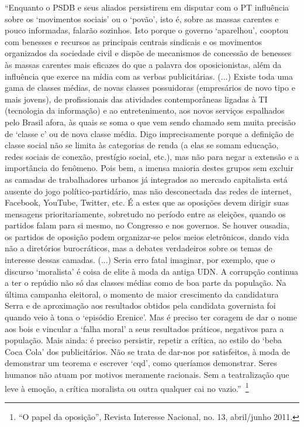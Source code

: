 ``Enquanto o PSDB e seus aliados persistirem em disputar com o PT
influência sobre os `movimentos sociais' ou o `povão', isto é, sobre as
massas carentes e pouco informadas, falarão sozinhos. Isto porque o
governo `aparelhou', cooptou com benesses e recursos as principais
centrais sindicais e os movimentos organizados da sociedade civil e
dispõe de mecanismos de concessão de benesses às massas carentes mais
eficazes do que a palavra dos oposicionistas, além da influência que
exerce na mídia com as verbas publicitárias. (...) Existe toda uma gama
de classes médias, de novas classes possuidoras (empresários de novo
tipo e mais jovens), de profissionais das atividades contemporâneas
ligadas à TI (tecnologia da informação) e ao entretenimento, aos novos
serviços espalhados pelo Brasil afora, às quais se soma o que vem sendo
chamado sem muita precisão de `classe c' ou de nova classe média. Digo
imprecisamente porque a definição de classe social não se limita às
categorias de renda (a elas se somam educação, redes sociais de conexão,
prestígio social, etc.), mas não para negar a extensão e a importância
do fenômeno. Pois bem, a imensa maioria destes grupos sem excluir as
camadas de trabalhadores urbanos já integrados ao mercado capitalista
está ausente do jogo político-partidário, mas não desconectada das redes
de internet, Facebook, YouTube, Twitter, etc. É a estes que as oposições
devem dirigir suas mensagens prioritariamente, sobretudo no período
entre as eleições, quando os partidos falam para si mesmo, no Congresso
e nos governos. Se houver ousadia, os partidos de oposição podem
organizar-se pelos meios eletrônicos, dando vida não a diretórios
burocráticos, mas a debates verdadeiros sobre os temas de interesse
dessas camadas. (...) Seria erro fatal imaginar, por exemplo, que o
discurso `moralista' é coisa de elite à moda da antiga UDN. A corrupção
continua a ter o repúdio não só das classes médias como de boa parte da
população. Na última campanha eleitoral, o momento de maior crescimento
da candidatura Serra e de aproximação aos resultados obtidos pela
candidata governista foi quando veio à tona o `episódio Erenice'. Mas é
preciso ter coragem de dar o nome aos bois e vincular a `falha moral' a
seus resultados práticos, negativos para a população. Mais ainda: é
preciso persistir, repetir a crítica, ao estilo do `beba Coca Cola' dos
publicitários. Não se trata de dar-nos por satisfeitos, à moda de
demonstrar um teorema e escrever `cqd', como queríamos demonstrar. Seres
humanos não atuam por motivos meramente racionais. Sem a teatralização
que leve à emoção, a crítica moralista ou outra qualquer cai no
vazio.''~\footnote{``O papel da oposição'', Revista Interesse Nacional,
  no. 13, abril/junho 2011.}

